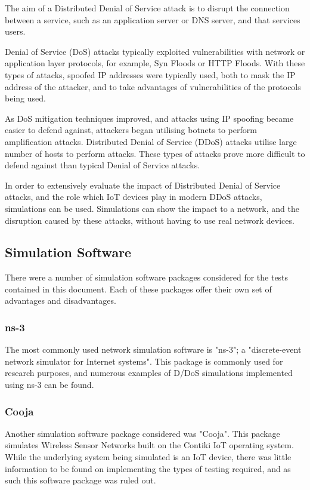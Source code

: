 The aim of a Distributed Denial of Service attack is to disrupt the connection
between a service, such as an application server or DNS server, and that
services users.

Denial of Service (DoS) attacks typically exploited vulnerabilities with network
or application layer protocols, for example, Syn Floods or HTTP Floods. With these
types of attacks, spoofed IP addresses were typically used, both to mask the IP
address of the attacker, and to take advantages of vulnerabilities of the
protocols being used.

As DoS mitigation techniques improved, and attacks using IP spoofing became
easier to defend against, attackers began utilising botnets to perform
amplification attacks. Distributed Denial of Service (DDoS) attacks utilise
large number of hosts to perform attacks. These types of attacks prove more
difficult to defend against than typical Denial of Service attacks.

In order to extensively evaluate the impact of Distributed Denial of Service
attacks, and the role which IoT devices play in modern DDoS attacks, simulations
can be used. Simulations can show the impact to a network, and the disruption
caused by these attacks, without having to use real network devices.

\subsection{Simulation Software}

There were a number of simulation software packages considered for the tests
contained in this document. Each of these packages offer their own set of
advantages and disadvantages.

\subsubsection{ns-3}

The most commonly used network simulation software is "ns-3"; a "discrete-event
network simulator for Internet systems"\cite{nsnam_20AD}. This package is
commonly used for research purposes, and numerous examples of D/DoS simulations
implemented using ns-3 can be found\cite{}\cite{}.

\subsubsection{Cooja}

Another simulation software package considered was "Cooja". This package
simulates Wireless Sensor Networks built on the Contiki IoT operating
system\cite{cooja_2019}. While the underlying system being simulated is an IoT device,
there was little information to be found on implementing the types of testing
required, and as such this software package was ruled out.

